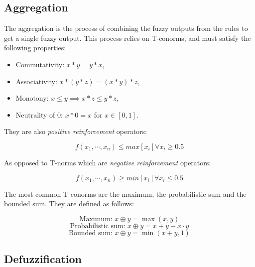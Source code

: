 \subsection{Aggregation}
\label{subsec:fuzzy-aggregation}

The aggregation is the process of combining the fuzzy outputs from the rules to get a single fuzzy output. This process
relies on T-conorms, and must satisfy the following properties:

\begin{itemize}
	\item Commutativity: $x * y = y * x$,
	\item Associativity: $x * (y * z) = (x * y) * z$,
	\item Monotony: $x \leq y \implies x * z \leq y * z$,
	\item Neutrality of 0: $x * 0 = x$ for $x \in [0, 1]$.
\end{itemize}

They are also \textit{positive reinforcement} operators:

\begin{equation}
	f(x_1, \cdots, x_n) \leq max[x_i] \forall x_i \geq 0.5
\end{equation}

As opposed to T-norms which are \textit{negative reinforcement} operators:

\begin{equation}
	f(x_1, \cdots, x_n) \geq min[x_i] \forall x_i \leq 0.5
\end{equation}

The most common T-conorms are the maximum, the probabilistic sum and the bounded sum. They are defined as follows:

\begin{minipage}{0.9624\textwidth}
	\begin{equation}
		\text{Maximum: } x \oplus y = \max(x, y)
	\end{equation}
	\begin{equation}
		\text{Probabilistic sum: } x \oplus y = x + y - x \cdot y
	\end{equation}
	\begin{equation}
		\text{Bounded sum: } x \oplus y = \min(x + y, 1)
	\end{equation}
\end{minipage}

\subsection{Defuzzification}
\label{subsec:fuzzy-defuzzification}

